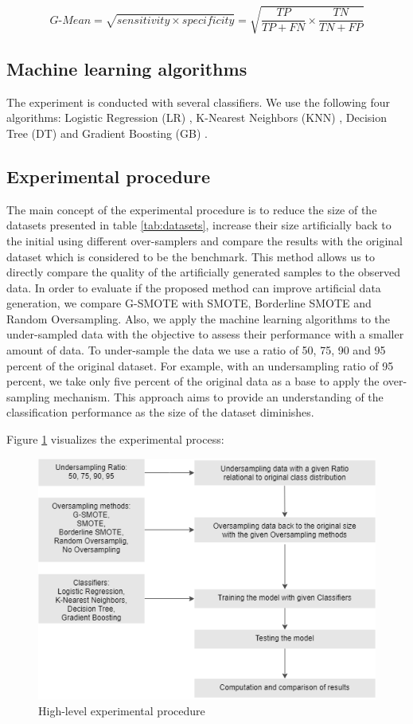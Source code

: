 \documentclass[parskip=full]{scrartcl}
\begin{document}
$$\textit{G-Mean} = \sqrt{sensitivity \times specificity} = \sqrt{\dfrac{TP}{TP + FN}
\times \dfrac{TN}{TN + FP}}$$

\subsection{Machine learning algorithms}

The experiment is conducted with several classifiers. We use the following four
algorithms: Logistic Regression (LR) \cite{McCullagh.2019}, K-Nearest Neighbors
(KNN) \cite{Cover.1967}, Decision Tree (DT) \cite{Salzberg.1994} and Gradient
Boosting (GB) \cite{Friedman.2001}.

\subsection{Experimental procedure}

The main concept of the experimental procedure is to reduce the size of the
datasets presented in table \ref{tab:datasets}, increase their size artificially
back to the initial using different over-samplers and compare the results with
the original dataset which is considered to be the benchmark. This method allows
us to directly compare the quality of the artificially generated samples to the
observed data. In order to evaluate if the proposed method can improve
artificial data generation, we compare G-SMOTE with SMOTE, Borderline SMOTE and
Random Oversampling. Also, we apply the machine learning algorithms to the
under-sampled data with the objective to assess their performance with a smaller
amount of data. To under-sample the data we use a ratio of 50, 75, 90 and 95
percent of the original dataset. For example, with an undersampling ratio of 95
percent, we take only five percent of the original data as a base to apply the
over-sampling mechanism. This approach aims to provide an understanding of the
classification performance as the size of the dataset diminishes.

Figure \ref{fig:experimentalprocedure} visualizes the experimental process: 

\begin{figure}[H]
	\centering
	\includegraphics[width=0.7\linewidth]{../analysis/experimental_procedure.png}
	\caption{High-level experimental procedure}
	\label{fig:experimentalprocedure}
\end{figure}
\end{document}

